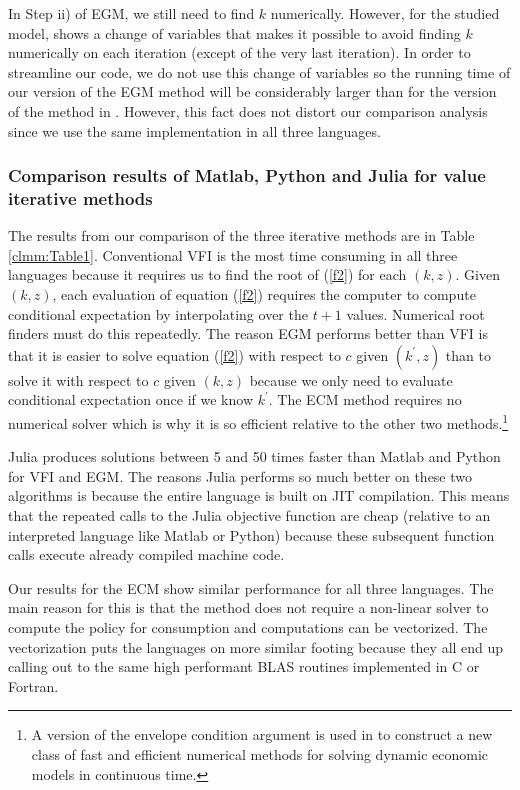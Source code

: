 \qquad \newline

In Step ii) of EGM, we still need to find $k$ numerically. However, for the
studied model, \cite{Carroll2006} shows a change of variables that makes it
possible to avoid finding $k$ numerically on each iteration (except of the
very last iteration). In order to streamline our code, we do not use this
change of variables so the running time of our version of the EGM method
will be considerably larger than for the version of the method in \cite
{Carroll2006}. However, this fact does not distort our comparison analysis
since we use the same implementation in all three languages.

\subsubsection{Comparison results of Matlab, Python and Julia for value iterative methods}

The results from our comparison of the three iterative methods are in Table
\ref{clmm:Table1}. Conventional VFI is the most time consuming in all three
languages because it requires us to find the root of (\ref{f2}) for each $(k,
z)$. Given $(k, z)$, each evaluation of equation (\ref{f2}) requires the computer
to compute conditional expectation by interpolating over the $t+1$ values.
Numerical root finders must do this repeatedly. The reason EGM performs better
than VFI is that it is easier to solve equation (\ref{f2}) with respect to $c$
given $\left(k^{\prime}, z\right)$ than to solve it with respect to $c$ given
$(k, z)$ because we only need to evaluate conditional expectation once if
we know $k^{\prime}$. The ECM method requires no numerical solver which is why
it is so efficient relative to the other two methods.\footnote{A version of the
envelope condition argument is used in \cite{AHLLM2017} to construct a new
class of fast and efficient numerical methods for solving dynamic economic
models in continuous time.}

Julia produces solutions between 5 and 50 times faster than Matlab and Python
for VFI and EGM. The reasons Julia performs so much better on these two
algorithms is because the entire language is built on JIT compilation. This
means that the repeated calls to the Julia objective
function are cheap (relative to an interpreted language like Matlab or Python)
because these subsequent function calls execute already compiled machine code.

Our results for the ECM show similar performance for all three languages. The
main reason for this is that the method does not require a non-linear solver to
compute the policy for consumption and computations can be vectorized. The
vectorization puts the languages on more similar footing because they all end
up calling out to the same high performant BLAS routines implemented in C or
Fortran.



